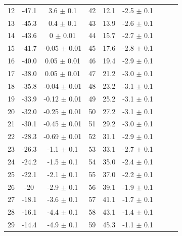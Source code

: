 \begin{table}[H]
\begin{tabular}{ccc|ccc|ccc}
  12 & -47.1   &   3.6   $\pm$  0.1   &      42 & 12.1    &   -2.5 $\pm$   0.1  &   &   & \\
  13 & -45.3   &   0.4   $\pm$  0.1   &      43 & 13.9    &   -2.6 $\pm$   0.1  &   &   & \\
  14 & -43.6   &   0     $\pm$  0.01  &      44 & 15.7    &   -2.7 $\pm$   0.1  &   &   & \\
  15 & -41.7   &   -0.05 $\pm$  0.01  &      45 & 17.6    &   -2.8 $\pm$   0.1  &   &   & \\
  16 & -40.0   &   0.05  $\pm$  0.01  &      46 & 19.4    &   -2.9 $\pm$   0.1  &   &   & \\
  17 & -38.0   &   0.05  $\pm$  0.01  &      47 & 21.2    &   -3.0 $\pm$   0.1  &   &   & \\
  18 & -35.8   &   -0.04 $\pm$  0.01  &      48 & 23.2    &   -3.1 $\pm$   0.1  &   &   & \\
  19 & -33.9   &   -0.12 $\pm$  0.01  &      49 & 25.2    &   -3.1 $\pm$   0.1  &   &   & \\
  20 & -32.0   &   -0.25 $\pm$  0.01  &      50 & 27.2    &   -3.1 $\pm$   0.1  &   &   & \\
  21 & -30.1   &   -0.45 $\pm$  0.01  &      51 & 29.2    &   -3.0 $\pm$   0.1  &   &   & \\
  22 & -28.3   &   -0.69 $\pm$  0.01  &      52 & 31.1    &   -2.9 $\pm$   0.1  &   &   & \\
  23 & -26.3   &   -1.1  $\pm$  0.1   &      53 & 33.1    &   -2.7 $\pm$   0.1  &   &   & \\
  24 & -24.2   &   -1.5  $\pm$  0.1   &      54 & 35.0    &   -2.4 $\pm$   0.1  &   &   & \\
  25 & -22.1   &   -2.1  $\pm$  0.1   &      55 & 37.0    &   -2.2 $\pm$   0.1  &   &   & \\
  26 & -20     &   -2.9  $\pm$  0.1   &      56 & 39.1    &   -1.9 $\pm$   0.1  &   &   & \\
  27 & -18.1   &   -3.6  $\pm$  0.1   &      57 & 41.1    &   -1.7 $\pm$   0.1  &   &   & \\
  28 & -16.1   &   -4.4  $\pm$  0.1   &      58 & 43.1    &   -1.4 $\pm$   0.1  &   &   & \\
  29 & -14.4   &   -4.9  $\pm$  0.1   &      59 & 45.3    &   -1.1 $\pm$   0.1  &   &   & \\ 
  \bottomrule 
  \end{tabular}
  \label{tab:b2_data}
\end{table}


